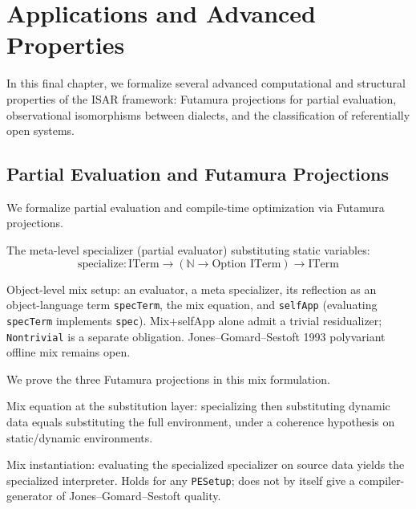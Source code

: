 \chapter{Applications and Advanced Properties}

In this final chapter, we formalize several advanced computational and structural properties of the ISAR framework: Futamura projections for partial evaluation, observational isomorphisms between dialects, and the classification of referentially open systems.

\section{Partial Evaluation and Futamura Projections}

We formalize partial evaluation and compile-time optimization via Futamura projections.

\begin{definition}[Specializer]
The meta-level specializer (partial evaluator) substituting static variables:
$$\text{specialize} : \text{ITerm} \to (\mathbb{N} \to \text{Option } \text{ITerm}) \to \text{ITerm}$$
\end{definition}

\begin{definition}[PE Setup]
Object-level mix setup: an evaluator, a meta specializer, its reflection as an object-language term \texttt{specTerm}, the mix equation, and \texttt{selfApp} (evaluating \texttt{specTerm} implements \texttt{spec}). Mix+selfApp alone admit a trivial residualizer; \texttt{Nontrivial} is a separate obligation. Jones--Gomard--Sestoft 1993 polyvariant offline mix remains open.
\end{definition}

We prove the three Futamura projections in this mix formulation.

\begin{theorem}
Mix equation at the substitution layer: specializing then substituting dynamic data equals substituting the full environment, under a coherence hypothesis on static/dynamic environments.
\end{theorem}

\begin{theorem}
Mix instantiation: evaluating the specialized specializer on source data yields the specialized interpreter. Holds for any \texttt{PESetup}; does not by itself give a compiler-generator of Jones--Gomard--Sestoft quality.
\end{theorem}


